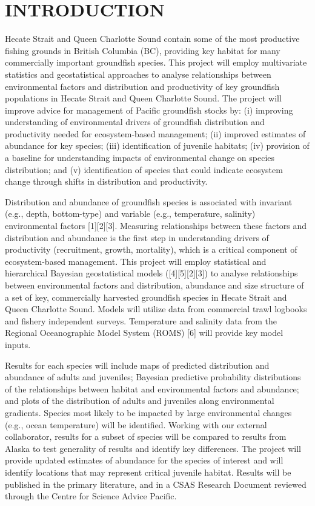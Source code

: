 \documentclass[11pt]{book}\usepackage[]{graphicx}\usepackage[]{color}
\begin{document}
\section{INTRODUCTION}
Hecate Strait and Queen Charlotte Sound contain some of the most productive fishing grounds in British Columbia (BC), providing key habitat for many commercially important groundfish species. This project will employ multivariate statistics and geostatistical approaches to analyse relationships between environmental factors and distribution and productivity of key groundfish populations in Hecate Strait and Queen Charlotte Sound. The project will improve advice for management of Pacific groundfish stocks by: (i) improving understanding of environmental drivers of groundfish distribution and productivity needed for ecosystem-based management; (ii) improved estimates of abundance for key species; (iii) identification of juvenile habitats;  (iv) provision of a baseline for understanding impacts of environmental change on species distribution; and (v) identification of species that could indicate ecosystem change through shifts in distribution and productivity.

Distribution and abundance of groundfish species is associated with invariant (e.g., depth, bottom-type) and variable (e.g., temperature, salinity) environmental factors [1][2][3].  Measuring relationships between these factors and distribution and abundance is the first step in understanding drivers of productivity (recruitment, growth, mortality), which is a critical component of ecosystem-based management. This project will employ statistical and hierarchical Bayesian geostatistical models ([4][5][2][3]) to analyse relationships between environmental factors and distribution, abundance and size structure of a set of key, commercially harvested groundfish species in Hecate Strait and Queen Charlotte Sound. Models will utilize data from commercial trawl logbooks and fishery independent surveys. Temperature and salinity data from the Regional Oceanographic Model System (ROMS) [6] will provide key model inputs.

Results for each species will include maps of predicted distribution and abundance of adults and juveniles; Bayesian predictive probability distributions of the relationships between habitat and environmental factors and abundance; and plots of the distribution of adults and juveniles along environmental gradients. Species most likely to be impacted by large environmental changes (e.g., ocean temperature) will be identified. Working with our external collaborator, results for a subset of species will be compared to results from Alaska to test generality of results and identify key differences. The project will provide updated estimates of abundance for the species of interest and will identify locations that may represent critical juvenile habitat. Results will be published in the primary literature, and in a CSAS Research Document reviewed through the Centre for Science Advice Pacific.
\end{document}
